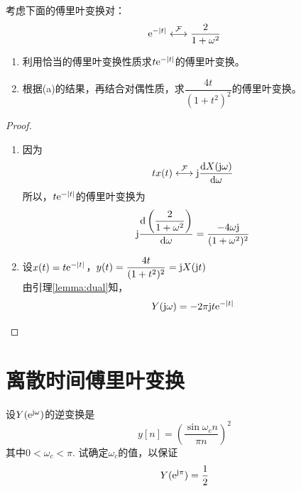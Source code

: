 \begin{proposition}

    考虑下面的傅里叶变换对：
    $$\mathrm{e}^{-|t|} \stackrel{\mathcal{F}}{\longleftrightarrow} \dfrac{2}{1 + \omega^2}$$

    \begin{enumerate}

        \item 利用恰当的傅里叶变换性质求$t\mathrm{e}^{-|t|}$的傅里叶变换。
        
        \item 根据\textup{(a)}的结果，再结合对偶性质，求$\dfrac{4t}{(1+t^2)^2}$的傅里叶变换。

    \end{enumerate}

\end{proposition}

\begin{proof}

    \begin{enumerate}

        \item 
            因为
            $$tx(t) \stackrel{\mathcal{F}}{\longleftrightarrow} \mathrm{j} \dfrac{\mathrm{d} X(\mathrm{j} \omega)}{\mathrm{d} \omega}$$
            所以，$t\mathrm{e}^{-|t|}$的傅里叶变换为
            $$\mathrm{j} \dfrac{\mathrm{d} \left( \dfrac{2}{1 + \omega^2} \right)}{\mathrm{d} \omega} = \dfrac{-4\omega \mathrm{j}}{(1 + \omega^2)^2}$$
        
        \item 
            设$x(t) = t\mathrm{e}^{-|t|}$，$y(t) = \dfrac{4t}{(1+t^2)^2} = \mathrm{j} X(\mathrm{j} t)$\\
            由引理\ref{lemma:dual}知，
            $$Y(\mathrm{j} \omega) = -2 \pi \mathrm{j} t \mathrm{e}^{-|t|}$$

    \end{enumerate}

\end{proof}

\section{离散时间傅里叶变换}

\begin{proposition}
    
    设$Y(\mathrm{e}^{\mathrm{j} \omega})$的逆变换是
    $$y[n] = \left( \dfrac{\sin{\omega_c n}}{\pi n}\right)^2$$
    其中$0 < \omega_c < \pi$. 试确定$\omega_c$的值，以保证
    $$Y(\mathrm{e}^{\mathrm{j} \pi}) = \dfrac{1}{2}$$

\end{proposition}

